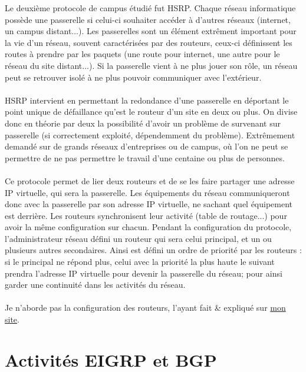 Le deuxième protocole de campus étudié fut HSRP. Chaque réseau informatique possède une passerelle si celui-ci souhaiter accéder à d'autres réseaux (internet, un campus distant...). Les passerelles sont un élément extrêment important pour la vie d'un réseau, souvent caractérisées par des routeurs, ceux-ci définissent les routes à prendre par les paquets (une route pour internet, une autre pour le réseau du site distant...). Si la passerelle vient à ne plus jouer son rôle, un réseau peut se retrouver isolé à ne plus pouvoir communiquer avec l'extérieur.
\\ \\
HSRP intervient en permettant la redondance d'une passerelle en déportant le point unique de défaillance qu'est le routeur d'un site en deux ou plus. On divise donc en théorie par deux la possibilité d'avoir un problème de survenant sur passerelle (si correctement exploité, dépendemment du problème). Extrêmement demandé sur de grands réseaux d'entreprises ou de campus, où l'on ne peut se permettre de ne pas permettre le travail d'une centaine ou plus de personnes.
\\ \\
Ce protocole permet de lier deux routeurs et de se les faire partager une adresse IP virtuelle, qui sera la passerelle. Les équipements du réseau communiqueront donc avec la passerelle par son adresse IP virtuelle, ne sachant quel équipement est derrière. Les routeurs synchronisent leur activité (table de routage...) pour avoir la même configuration sur chacun. Pendant la configuration du protocole, l'administrateur réseau défini un routeur qui sera celui principal, et un ou plusieurs autres secondaires. Ainsi est défini un ordre de priorité par les routeurs : si le principal ne répond plus, celui avec la priorité la plus haute le suivant prendra l'adresse IP virtuelle pour devenir la passerelle du réseau; pour ainsi garder une continuité dans les activités du réseau.
\\ \\
Je n'aborde pas la configuration des routeurs, l'ayant fait \& expliqué sur \href{http://xeylou.fr/posts/cisco-hsrp/}{mon site}.

\section{Activités EIGRP et BGP}

